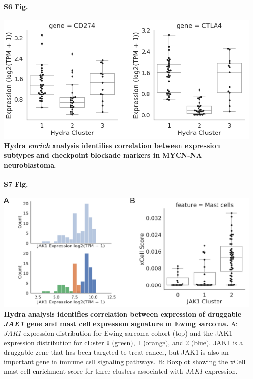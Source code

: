 \documentclass[10pt,letterpaper]{article}
\begin{document}
\paragraph*{S6 Fig.}
\includegraphics[width=\textwidth]{img/PNG/Checkpoint-Plots-V1}
\label{S6_Fig} {\bf Hydra \textit{enrich} analysis identifies correlation between expression subtypes and checkpoint blockade markers in MYCN-NA neuroblastoma.}

\paragraph*{S7 Fig.}
\includegraphics[width=\textwidth]{img/PNG/ewing-jak1-expression-fig}
\label{S7_Fig} {\bf Hydra analysis identifies correlation between expression of druggable \textit{JAK1} gene and mast cell expression signature in Ewing sarcoma.} A: \textit{JAK1} expression distribution for Ewing sarcoma cohort (top) and the JAK1 expression distribution for cluster 0 (green), 1 (orange), and 2 (blue).  JAK1 is a druggable gene that has been targeted to treat cancer, but JAK1 is also an important gene in immune cell signaling pathways. B: Boxplot showing the xCell mast cell enrichment score for three clusters associated with \textit{JAK1} expression.
\end{document}
